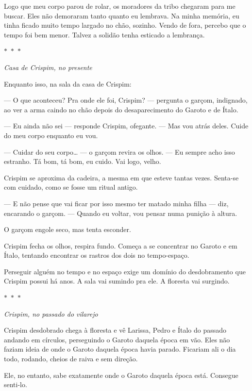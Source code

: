 Logo que meu corpo parou de rolar, os moradores da tribo chegaram para me buscar.  
Eles não demoraram tanto quanto eu lembrava.  
Na minha memória, eu tinha ficado muito tempo largado no chão, sozinho.  
Vendo de fora, percebo que o tempo foi bem menor.  
Talvez a solidão tenha esticado a lembrança.

\begin{center}
  $\ast$~$\ast$~$\ast$

  \textit{Casa de Crispim, no presente}
\end{center}

Enquanto isso, na sala da casa de Crispim:

— O que aconteceu? Pra onde ele foi, Crispim? — pergunta o garçom, indignado, ao ver a arma caindo no chão depois do desaparecimento do Garoto e de Ítalo.

— Eu ainda não sei — responde Crispim, ofegante. — Mas vou atrás deles. Cuide do meu corpo enquanto eu vou.

— Cuidar do seu corpo… — o garçom revira os olhos. — Eu sempre acho isso estranho.  
Tá bom, tá bom, eu cuido. Vai logo, velho.

Crispim se aproxima da cadeira, a mesma em que esteve tantas vezes.  
Senta-se com cuidado, como se fosse um ritual antigo.

— E não pense que vai ficar por isso mesmo ter matado minha filha — diz, encarando o garçom. — Quando eu voltar, vou pensar numa punição à altura.

O garçom engole seco, mas tenta esconder.

Crispim fecha os olhos, respira fundo.  
Começa a se concentrar no Garoto e em Ítalo, tentando encontrar os rastros dos dois no tempo-espaço.

Perseguir alguém no tempo e no espaço exige um domínio do desdobramento que Crispim possui há anos.
A sala vai sumindo pra ele.  
A floresta vai surgindo.

\begin{center}
  $\ast$~$\ast$~$\ast$

  \textit{Crispim, no passado do vilarejo}
\end{center}

Crispim desdobrado chega à floresta e vê Larissa, Pedro e Ítalo do passado andando em círculos, perseguindo o Garoto daquela época em vão.
Eles não faziam ideia de onde o Garoto daquela época havia parado.
Ficariam ali o dia todo, rodando, cheios de raiva e sem direção.

Ele, no entanto, sabe exatamente onde o Garoto daquela época está.
Consegue senti-lo.

